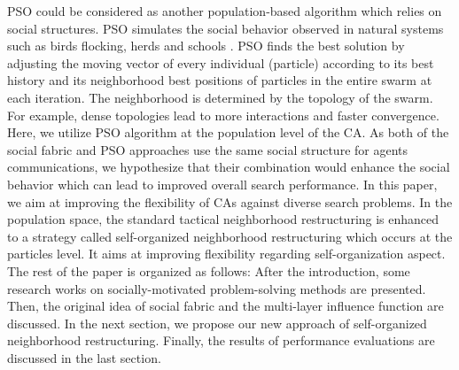 \documentclass{llncs}
\begin{document}
PSO could be considered as another population-based algorithm which relies on social structures. PSO simulates the social behavior observed in natural systems such as birds flocking, herds and schools \cite{kennedy2011particle}. PSO finds the best solution by adjusting the moving vector of every individual (particle) according to its best history and its neighborhood best positions of particles in the entire swarm at each iteration. The neighborhood is determined by the topology of the swarm. For example, dense topologies lead to more interactions and faster convergence. Here, we utilize PSO algorithm at the population level of the CA. As both of the social fabric and PSO approaches use the same social structure for agents communications, we hypothesize that their combination would enhance the social behavior which can lead to improved overall search performance. \newline
In this paper, we aim at improving the flexibility of CAs against diverse search problems. In the population space, the standard tactical neighborhood restructuring is enhanced to a strategy called self-organized neighborhood restructuring which occurs at the particles level. It aims at improving flexibility regarding self-organization aspect.\newline
The rest of the paper is organized as follows: After the introduction, some research works on socially-motivated problem-solving methods are presented. Then, the original idea of social fabric and the multi-layer influence function are discussed. In the next section, we propose our new approach of self-organized neighborhood restructuring. Finally, the results of performance evaluations are discussed in the last section.
\end{document}
